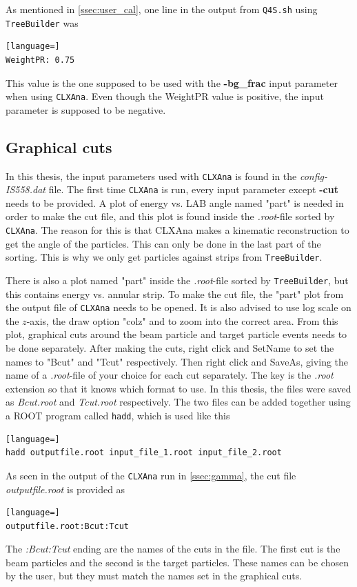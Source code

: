 \documentclass[twoside,english]{uiofysmaster/uiofysmaster}
\let\orgautoref\autoref
\renewcommand{\autoref}
        {%
		 \def\sectionautorefname{Section}%
		 \def\subsectionautorefname{Section}%
		 \def\subsubsectionautorefname{Section}%
		 \def\chapterautorefname{Chapter}%
          \orgautoref}
\begin{document}
\begin{appendices}
As mentioned in \autoref{ssec:user_cal}, one line in the output from \texttt{Q4S.sh} using \texttt{TreeBuilder} was
\begin{lstlisting}[language=]
WeightPR: 0.75
\end{lstlisting}
This value is the one supposed to be used with the \textbf{-bg\_frac} input parameter when using \texttt{CLXAna}.
Even though the WeightPR value is positive, the input parameter is supposed to be negative.  


\subsection{Graphical cuts}
In this thesis, the input parameters used with \texttt{CLXAna} is found in the \textit{config-IS558.dat} file.
The first time \texttt{CLXAna} is run, every input parameter except \textbf{-cut} needs to be provided. 
A plot of energy vs. LAB angle named "part" is needed in order to make the cut file, and this plot is found inside the \textit{.root}-file sorted by \texttt{CLXAna}.
The reason for this is that CLXAna makes a kinematic reconstruction to get the angle of the particles.
This can only be done in the last part of the sorting.
This is why we only get particles against strips from \texttt{TreeBuilder}.

There is also a plot named "part" inside the \textit{.root}-file sorted by \texttt{TreeBuilder}, but this contains energy vs. annular strip.
To make the cut file, the "part" plot from the output file of \texttt{CLXAna} needs to be opened.
It is also advised to use log scale on the $z$-axis, the draw option "colz" and to zoom into the correct area.
From this plot, graphical cuts around the beam particle and target particle events needs to be done separately. 
After making the cuts, right click and SetName to set the names to "Bcut" and "Tcut" respectively. 
Then right click and SaveAs, giving the name of a \textit{.root}-file of your choice for each cut separately. 
The key is the \textit{.root} extension so that it knows which format to use. 
In this thesis, the files were saved as \textit{Bcut.root} and \textit{Tcut.root} respectively.
The two files can be added together using a ROOT program called \texttt{hadd}, which is used like this
\begin{lstlisting}[language=]
hadd outputfile.root input_file_1.root input_file_2.root 
\end{lstlisting}

As seen in the output of the \texttt{CLXAna} run in \autoref{ssec:gamma}, the cut file \textit{outputfile.root} is provided as  
\begin{lstlisting}[language=]
outputfile.root:Bcut:Tcut
\end{lstlisting}
The \textit{:Bcut:Tcut} ending are the names of the cuts in the file. 
The first cut is the beam particles and the second is the target particles. 
These names can be chosen by the user, but they must match the names set in the graphical cuts. 


\end{appendices}
\end{document}
